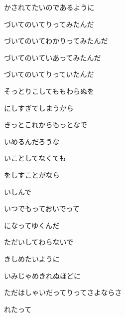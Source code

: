 \documentclass[a4paper,tate,twocolumn,12pt]{ltjtarticle}
\begin{document}
\begin{flushleft}
\begin{minipage}{\linewidth}
かされてたいのであるように
\end{minipage}

\vspace{2em}

\noindent\begin{minipage}{\linewidth}
づいてのいてりってみたんだ

づいてのいてわかりってみたんだ

づいてのいていあってみたんだ

づいてのいてりっていたんだ
\end{minipage}

\vspace{2em}

\noindent\begin{minipage}{\linewidth}
そっとりこしてももわらぬを

にしすぎてしまうから

きっとこれからもっとなで

いめるんだろうな

いことしてなくても

をしすことがなら

いしんで

いつでもっておいでって

になってゆくんだ
\end{minipage}

\vspace{2em}

\noindent\begin{minipage}{\linewidth}
ただいしてわらないで

きしめたいように

いみじゃめきれぬほどに

ただはしゃいだってりってさよならさ

れたって


\end{minipage}
\end{flushleft}
\end{document}
